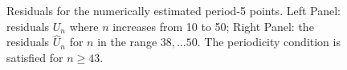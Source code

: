 \documentclass[12pt,a4paper]{amsart}
\begin{document}
\begin{figure}[h!]
\caption{Residuals for the numerically estimated period-5 points.  Left Panel: residuals $U_n$ where $n$ increases from 10 to 50; Right Panel: the residuals  $\hat{U}_n$ for $n$ in the range $38, \dots 50$. The periodicity condition is satisfied for $n \ge 43$.} \label{f5}
\end{figure}
\end{document}
